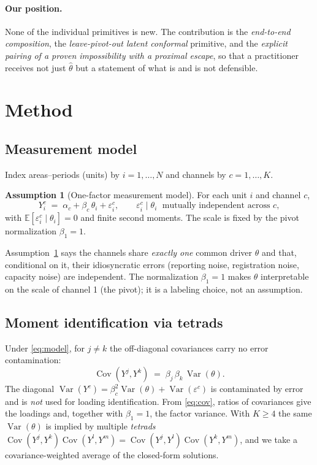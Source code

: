 \documentclass[11pt]{article}
\theoremstyle{definition}
\newtheorem{assumption}{Assumption}
\theoremstyle{remark}
\newcommand{\Var}{\operatorname{Var}}
\newcommand{\Cov}{\operatorname{Cov}}
\newcommand{\E}{\mathbb{E}}
\newcommand{\thh}{\widehat{\theta}}
\newcommand{\eps}{\varepsilon}
\begin{document}
\paragraph{Our position.}
None of the individual primitives is new. The contribution is the
\emph{end-to-end composition}, the \emph{leave-pivot-out latent conformal}
primitive, and the \emph{explicit pairing of a proven impossibility with a
proximal escape}, so that a practitioner receives not just $\thh$ but a
statement of what is and is not defensible.

\section{Method}\label{sec:method}

\subsection{Measurement model}\label{sec:model}

Index areas--periods (units) by $i=1,\dots,N$ and channels by
$c=1,\dots,K$.

\begin{assumption}[One-factor measurement model]\label{ass:onefactor}
For each unit $i$ and channel $c$,
\begin{equation}\label{eq:model}
Y^{c}_i \;=\; \alpha_c + \beta_c\,\theta_i + \eps^{c}_i,
\qquad
\eps^{c}_i \mid \theta_i \;\text{ mutually independent across } c,
\end{equation}
with $\E[\eps^c_i\mid\theta_i]=0$ and finite second moments. The scale is
fixed by the pivot normalization $\beta_1 = 1$.
\end{assumption}

Assumption~\ref{ass:onefactor} says the channels share \emph{exactly one}
common driver $\theta$ and that, conditional on it, their idiosyncratic
errors (reporting noise, registration noise, capacity noise) are
independent. The normalization $\beta_1=1$ makes $\theta$ interpretable on
the scale of channel 1 (the pivot); it is a labeling choice, not an
assumption.

\subsection{Moment identification via tetrads}\label{sec:ident}

Under \eqref{eq:model}, for $j \ne k$ the off-diagonal covariances carry no
error contamination:
\begin{equation}\label{eq:cov}
\Cov(Y^j, Y^k) \;=\; \beta_j\,\beta_k\,\Var(\theta).
\end{equation}
The diagonal $\Var(Y^c)=\beta_c^2\Var(\theta)+\Var(\eps^c)$ is contaminated
by error and is \emph{not} used for loading identification. From
\eqref{eq:cov}, ratios of covariances give the loadings and, together with
$\beta_1=1$, the factor variance. With $K\ge 4$ the same $\Var(\theta)$ is
implied by multiple \emph{tetrads}
$\Cov(Y^j,Y^k)\Cov(Y^l,Y^m) = \Cov(Y^j,Y^l)\Cov(Y^k,Y^m)$, and we take a
covariance-weighted average of the closed-form solutions.
\end{document}
